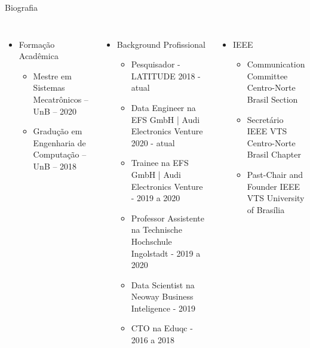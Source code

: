 

  
 
 


\justify
 \maketitle


\begin {frame}[shrink=30]{Biografia}
\small
\begin{columns}[c]
\centering
\begin{itemize}
  \item Formação Acadêmica
  \begin{itemize}
    \item Mestre em Sistemas Mecatrônicos -- UnB -- 2020
    \item Gradução em Engenharia de Computação -- UnB -- 2018
  \end{itemize}
\end{itemize}

\begin{itemize}
  \item Background Profissional
  \begin{itemize}
    \item Pesquisador - LATITUDE 2018 - atual
    \item Data Engineer na EFS GmbH | Audi Electronics Venture 2020 - atual
    \item Trainee na EFS GmbH | Audi Electronics Venture - 2019 a 2020
    \item Professor Assistente na Technische Hochschule Ingolstadt - 2019 a 2020
    \item Data Scientist na Neoway Business Inteligence - 2019
    \item CTO na Eduqc - 2016 a 2018
  \end{itemize}
\end{itemize}


\centering

\begin{itemize}
  \item IEEE
  \begin{itemize}
    \item Communication Committee Centro-Norte Brasil Section
    \item Secretário IEEE VTS Centro-Norte Brasil Chapter
    \item Past-Chair and Founder IEEE VTS University of Brasília
  \end{itemize}
\end{itemize}


\end{columns}
\end{frame}
